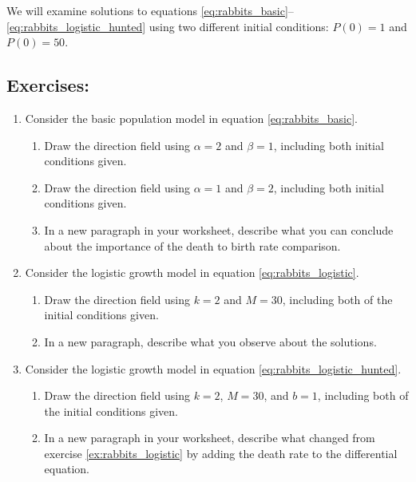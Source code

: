 We will examine solutions to equations \eqref{eq:rabbits_basic}--\eqref{eq:rabbits_logistic_hunted} using two different initial conditions: $P(0)=1$ and $P(0)=50$.

\subsection*{Exercises:}

\begin{enumerate}
\item Consider the basic population model in equation \eqref{eq:rabbits_basic}.
\begin{enumerate}
    \item Draw the direction field using $\alpha=2$ and $\beta=1$, including both initial conditions given.
    \item Draw the direction field using $\alpha=1$ and $\beta=2$, including both initial conditions given.
    \item In a new paragraph in your worksheet, describe what you can conclude about the importance of the death to birth rate comparison.
\end{enumerate}
\clearpage
\item Consider the logistic growth model in equation \eqref{eq:rabbits_logistic}.
\label{ex:rabbits_logistic}
\begin{enumerate}
    \item Draw the direction field using $k=2$ and $M=30$, including both of the initial conditions given.
    \item In a new paragraph, describe what you observe about the solutions.
\end{enumerate}
\item Consider the logistic growth model in equation \eqref{eq:rabbits_logistic_hunted}.
\begin{enumerate}
    \item Draw the direction field using $k=2$, $M=30$, and $b=1$, including both of the initial conditions given.
    \item In a new paragraph in your worksheet, describe what changed from exercise \ref{ex:rabbits_logistic} by adding the death rate to the differential equation.
\end{enumerate} 
\end{enumerate}

